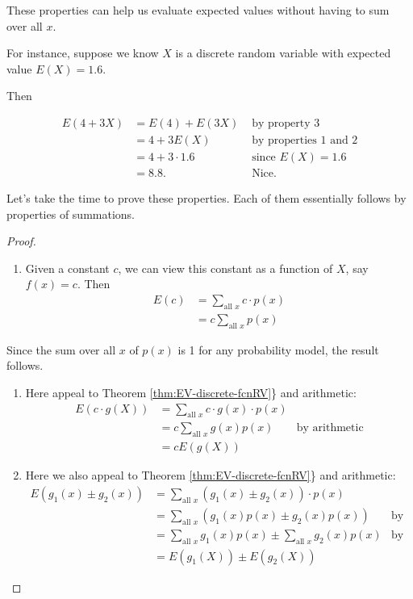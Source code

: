 \documentclass[
]{book}
\providecommand{\tightlist}{%
  \setlength{\itemsep}{0pt}\setlength{\parskip}{0pt}}
\theoremstyle{definition}
\theoremstyle{definition}
\theoremstyle{definition}
\theoremstyle{definition}
\theoremstyle{remark}
\begin{document}
These properties can help us evaluate expected values without having to sum over all \(x\).

For instance, suppose we know \(X\) is a discrete random variable with expected value \(E(X) = 1.6\).

Then

\begin{align*}
E(4+3X) &= E(4) + E(3X) &\text{ by property 3} \\
        &= 4 + 3E(X) &\text{ by properties 1 and 2}\\
        &= 4 + 3 \cdot 1.6 &\text { since }E(X) = 1.6 \\
        &= 8.8. &\text{ Nice.}
\end{align*}

Let's take the time to prove these properties. Each of them essentially follows by properties of summations.

\begin{proof}
\leavevmode

\begin{enumerate}
\def\labelenumi{\arabic{enumi}.}
\tightlist
\item
  Given a constant \(c\), we can view this constant as a function of \(X\), say \(f(x) = c\). Then
  \begin{align*}
  E(c) &= \sum_{\text{all }x} c \cdot p(x) \\
  &= c \sum_{\text{all }x} p(x)
  \end{align*}
\end{enumerate}

Since the sum over all \(x\) of \(p(x)\) is 1 for any probability model, the result follows.

\begin{enumerate}
\def\labelenumi{\arabic{enumi}.}
\setcounter{enumi}{1}
\item
  Here appeal to Theorem \ref{thm:EV-discrete-fcnRV}\} and arithmetic:
  \begin{align*}
  E(c\cdot g(X)) &= \sum_{\text{all }x} c \cdot g(x) \cdot p(x) & \\
  &= c \sum_{\text{all }x} g(x) p(x) &\text{by arithmetic}\\
  &= c E(g(X)) & 
  \end{align*}
\item
  Here we also appeal to Theorem \ref{thm:EV-discrete-fcnRV}\} and arithmetic:
  \begin{align*}
  E(g_1(x) \pm g_2(x)) &= \sum_{\text{all }x} (g_1(x) \pm g_2(x))\cdot p(x) &\\
  &= \sum_{\text{all }x} (g_1(x) p(x) \pm g_2(x) p(x)) &\text{by arithmetic}\\
  &= \sum_{\text{all }x} g_1(x) p(x) \pm \sum_{\text{all }x} g_2(x) p(x)  &\text{by arithmetic}\\
  &= E(g_1(X)) \pm E(g_2(X)) & 
  \end{align*}
\end{enumerate}

\end{proof}
\end{document}
